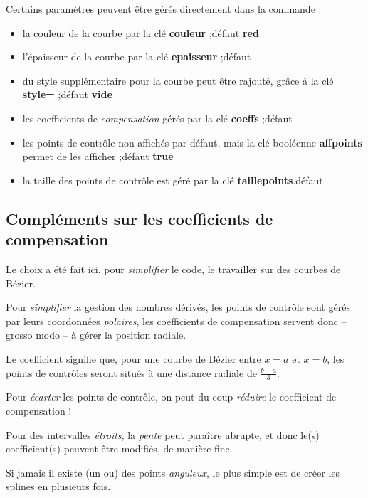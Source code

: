 \documentclass{article}
\newcommand\ctex[1]{\tcbox[vignettelatex]{#1}}
\newcommand\Cle[1]{{\bfseries\sffamily\textlangle #1\textrangle}}
\begin{document}
\begin{codecles}
Certains paramètres peuvent être gérés directement dans la commande \ctex{\textbackslash splinetikz} :
%
\begin{itemize}
	\item la couleur de la courbe par la \textsf{clé} \Cle{couleur} ;\hfill{}défaut \Cle{red}
	\item l'épaisseur de la courbe par la \textsf{clé} \Cle{epaisseur} ;\hfill{}défaut \Cle{1.25pt}
	\item du style supplémentaire pour la courbe peut être rajouté, grâce à la \textsf{clé} \Cle{style=} ;\hfill{}défaut \Cle{vide}
	\item les coefficients de \textit{compensation} gérés par la \textsf{clé} \Cle{coeffs} ;\hfill{}défaut \Cle{3}
	\item les points de contrôle non affichés par défaut, mais la \textsf{clé booléenne} \Cle{affpoints} permet de les afficher ;\hfill{}défaut \Cle{true}
	\item la taille des points de contrôle est géré par la \textsf{clé} \Cle{taillepoints}.\hfill{}défaut \Cle{2pt}
\end{itemize}
\end{codecles}

\subsection{Compléments sur les coefficients de \og compensation \fg}

\begin{codeidee}
Le choix a été fait ici, pour \textit{simplifier} le code, le travailler sur des courbes de Bézier.

Pour \textit{simplifier} la gestion des nombres dérivés, les points de contrôle sont gérés par leurs coordonnées \textit{polaires}, les \textsf{coefficients de compensation} servent donc -- grosso modo -- à gérer la position radiale.

\smallskip

Le coefficient \Cle{3} signifie que, pour une courbe de Bézier entre $x=a$ et $x=b$, les points de contrôles seront situés à une distance radiale de $\frac{b-a}{3}$.

Pour \textit{écarter} les points de contrôle, on peut du coup \textit{réduire} le coefficient de compensation !

\medskip

Pour des intervalles \textit{étroits}, la \textit{pente} peut paraître abrupte, et donc le(s) coefficient(s) peuvent être modifiés, de manière fine.

\medskip

Si jamais il existe (un ou) des points \textit{anguleux}, le plus simple est de créer les splines en plusieurs fois.
\end{codeidee}
\end{document}
